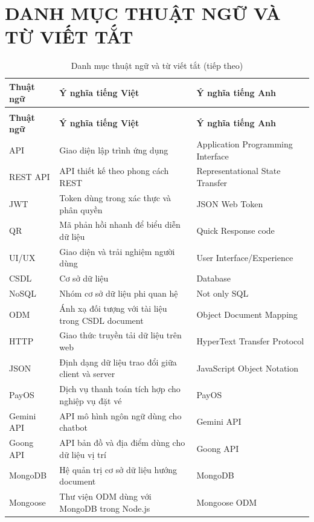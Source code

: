 \documentclass[../DoAn.tex]{subfiles}
\begin{document}
\chapter*{DANH MỤC THUẬT NGỮ VÀ TỪ VIẾT TẮT}
\begingroup
\small
{}
\renewcommand{\arraystretch}{1.05}
\setlength{\tabcolsep}{3pt}
\begin{longtable}{|L{2.2cm}|L{7.1cm}|L{4.4cm}|}
\caption{Danh mục thuật ngữ và từ viết tắt}\label{tab:abbr}\\
\hline
\textbf{Thuật ngữ} & \textbf{Ý nghĩa tiếng Việt} & \textbf{Ý nghĩa tiếng Anh} \\
\hline
\endfirsthead
\caption[]{Danh mục thuật ngữ và từ viết tắt (tiếp theo)}\\
\hline
\textbf{Thuật ngữ} & \textbf{Ý nghĩa tiếng Việt} & \textbf{Ý nghĩa tiếng Anh} \\
\hline
\endhead
API & Giao diện lập trình ứng dụng & Application Programming Interface \\
\hline
REST API & API thiết kế theo phong cách REST & Representational State Transfer \\
\hline
JWT & Token dùng trong xác thực và phân quyền & JSON Web Token \\
\hline
QR & Mã phản hồi nhanh để biểu diễn dữ liệu & Quick Response code \\
\hline
UI/UX & Giao diện và trải nghiệm người dùng & User Interface/Experience \\
\hline
CSDL & Cơ sở dữ liệu & Database \\
\hline
NoSQL & Nhóm cơ sở dữ liệu phi quan hệ & Not only SQL \\
\hline
ODM & Ánh xạ đối tượng với tài liệu trong CSDL document & Object Document Mapping \\
\hline
HTTP & Giao thức truyền tải dữ liệu trên web & HyperText Transfer Protocol \\
\hline
JSON & Định dạng dữ liệu trao đổi giữa client và server & JavaScript Object Notation \\
\hline
PayOS & Dịch vụ thanh toán tích hợp cho nghiệp vụ đặt vé & PayOS \\
\hline
Gemini API & API mô hình ngôn ngữ dùng cho chatbot & Gemini API \\
\hline
Goong API & API bản đồ và địa điểm dùng cho dữ liệu vị trí & Goong API \\
\hline
MongoDB & Hệ quản trị cơ sở dữ liệu hướng document & MongoDB \\
\hline
Mongoose & Thư viện ODM dùng với MongoDB trong Node.js & Mongoose ODM \\

\end{longtable}
\end{document}
